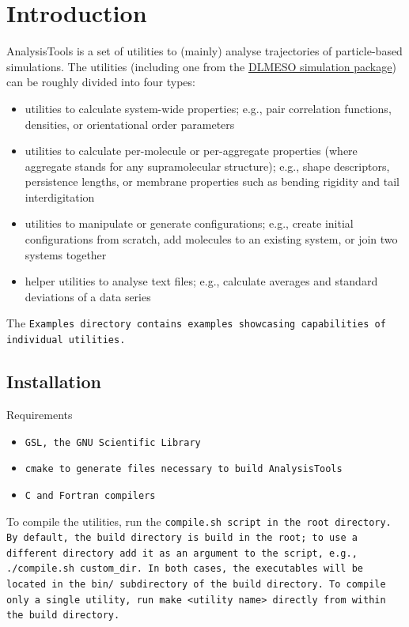 \chapter{Introduction}

AnalysisTools is a set of utilities to (mainly) analyse trajectories of
particle-based simulations. The utilities (including one
from the \href{https://www.scd.stfc.ac.uk/Pages/DL_MESO.aspx}{DLMESO
simulation package}) can be roughly divided into four types:

\begin{itemize}
  \item utilities to calculate system-wide properties; e.g., pair
    correlation functions, densities, or orientational order parameters
  \item utilities to calculate per-molecule or per-aggregate properties
    (where aggregate stands for any supramolecular structure); e.g., shape
    descriptors, persistence lengths, or membrane properties such as bending
    rigidity and tail interdigitation
  \item utilities to manipulate or generate configurations; e.g., create
    initial configurations from scratch, add molecules to an existing system,
    or join two systems together
  \item helper utilities to analyse text files; e.g., calculate averages
    and standard deviations of a data series
\end{itemize}

The \tt{Examples} directory contains examples showcasing capabilities of
individual utilities.

\section{Installation}

Requirements
\begin{itemize}
  \item \tt{GSL}, the GNU Scientific Library
  \item \tt{cmake} to generate files necessary to build AnalysisTools
  \item \tt{C} and \tt{Fortran} compilers
\end{itemize}

To compile the utilities, run the \tt{compile.sh} script in the \AT root
directory. By default, the build directory is \tt{build} in the \AT root; to use
a different directory add it as an argument to the script, e.g.,
\tt{./compile.sh custom_dir}. In both cases, the executables will be located in the
\tt{bin/} subdirectory of the build directory. To compile only a single utility,
run \tt{make <utility name>} directly from within the build directory.

